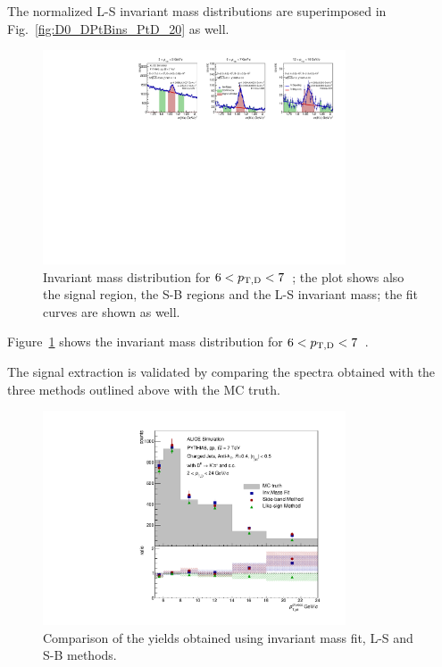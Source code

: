 The normalized L-S invariant mass distributions are superimposed in Fig.~\ref{fig:D0_DPtBins_PtD_20} as well.
\begin{figure}[tbh]
\begin{center}
\includegraphics[width=0.8\textwidth]{img/HQ16_Simulation_InvMassSB}
 \caption{Invariant mass distribution for $6 < p_{\mathrm{T,D}} < 7$~\GeVc; the plot shows also the signal region, the S-B regions and the L-S invariant mass; the fit curves are shown as well.} 
 \label{fig:HQ16_Simulation_InvMassSB}
\end{center}
\end{figure}
Figure~\ref{fig:HQ16_Simulation_InvMassSB} shows the invariant mass distribution for $6 < p_{\mathrm{T,D}} < 7$~\GeVc. 

The signal extraction is validated by comparing the spectra obtained with the three methods outlined above with the MC truth. 
\begin{figure}[tbh]
\begin{center}
\includegraphics[width=0.8\textwidth]{img/HQ16_Simulation_MethodComparison}
 \caption{Comparison of the yields obtained using invariant mass fit, L-S and S-B methods.} 
 \label{fig:HQ16_Simulation_MethodComparison}
\end{center}
\end{figure}

